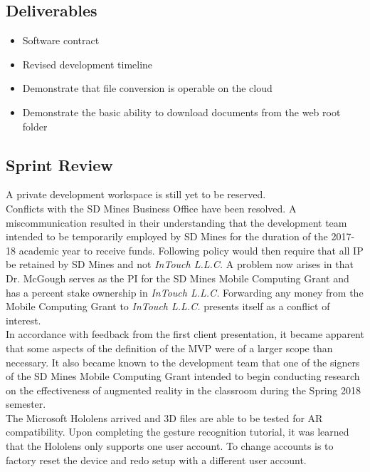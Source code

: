     \subsection{Deliverables}
    \label{sec:Sprint3_deliverables}
        \begin{itemize}
            \item Software contract
            \item Revised development timeline
            \item Demonstrate that file conversion is operable on the cloud
            \item Demonstrate the basic ability to download documents from the web root folder
        \end{itemize}

    \subsection{Sprint Review}
    \label{sec:Sprint3_review}
        \hspace{7mm}
        A private development workspace is still yet to be reserved.\\

        Conflicts with the SD Mines Business Office have been resolved.  A miscommunication resulted in their
        understanding that the development team intended to be temporarily employed by SD Mines for the duration
        of the 2017-18 academic year to receive funds.  Following policy would then require that all IP be retained
        by SD Mines and not \textit{InTouch L.L.C.}  A problem now arises in that Dr. McGough serves as the PI for
        the SD Mines Mobile Computing Grant and has a percent stake ownership in \textit{InTouch L.L.C.}  Forwarding
        any money from the Mobile Computing Grant to \textit{InTouch L.L.C.} presents itself as a conflict of interest.\\
        
        In accordance with feedback from the first client presentation, it became apparent that some aspects of the 
        definition of the MVP were of a larger scope than necessary.  It also became known to the development team
        that one of the signers of the SD Mines Mobile Computing Grant intended to begin conducting research on the
        effectiveness of augmented reality in the classroom during the Spring 2018 semester.\\

        The Microsoft Hololens arrived and 3D files are able to be tested for AR compatibility.  Upon completing
        the gesture recognition tutorial, it was learned that the Hololens only supports one user account.  To
        change accounts is to factory reset the device and redo setup with a different user account.\\

